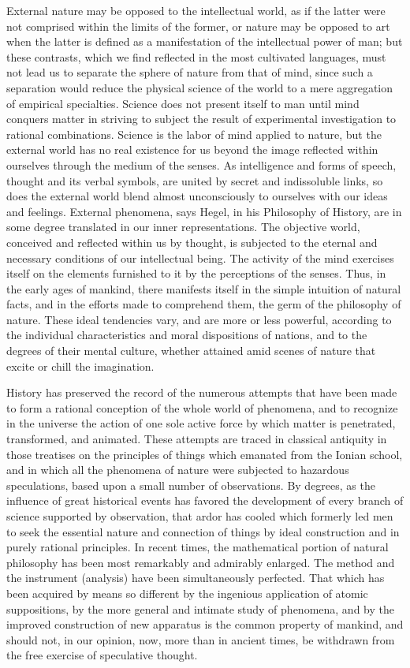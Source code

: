 External nature may be opposed to the intellectual world, as if the latter were not comprised within the limits of the former, or nature may be opposed to art when the latter is defined as a manifestation of the intellectual power of man; but these contrasts, which we find reflected in the most cultivated languages, must not lead us to separate the sphere of nature from that of mind, since such a separation would reduce the physical science of the world to a mere aggregation of empirical specialties. Science does not present itself to man until mind conquers matter in striving to subject the result of experimental investigation to rational combinations. Science is the labor of mind applied to nature, but the external world has no real existence for us beyond the image reflected within ourselves through the medium of the senses. As intelligence and forms of speech, thought and its verbal symbols, are united by secret and indissoluble links, so does the external world blend almost unconsciously to ourselves with our ideas and feelings. External phenomena, says Hegel, in his Philosophy of History, are in some degree translated in our inner representations. The objective world, conceived and reflected within us by thought, is subjected to the eternal and necessary conditions of our intellectual being. The activity of the mind exercises itself on the elements furnished to it by the perceptions of the senses. Thus, in the early ages of mankind, there manifests itself in the simple intuition of natural facts, and in the efforts made to comprehend them, the germ of the philosophy of nature. These ideal tendencies vary, and are more or less powerful, according to the individual characteristics and moral dispositions of nations, and to the degrees of their mental culture, whether attained amid scenes of nature that excite or chill the imagination.

History has preserved the record of the numerous attempts that have been made to form a rational conception of the whole world of phenomena, and to recognize in the universe the action of one sole active force by which matter is penetrated, transformed, and animated. These attempts are traced in classical antiquity in those treatises on the principles of things which emanated from the Ionian school, and in which all the phenomena of nature were subjected to hazardous speculations, based upon a small number of observations. By degrees, as the influence of great historical events has favored the development of every branch of science supported by observation, that ardor has cooled which formerly led men to seek the essential nature and connection of things by ideal construction and in purely rational principles. In recent times, the mathematical portion of natural philosophy has been most remarkably and admirably enlarged. The method and the instrument (analysis) have been simultaneously perfected. That which has been acquired by means so different by the ingenious application of atomic suppositions, by the more general and intimate study of phenomena, and by the improved construction of new apparatus is the common property of mankind, and should not, in our opinion, now, more than in ancient times, be withdrawn from the free exercise of speculative thought.

